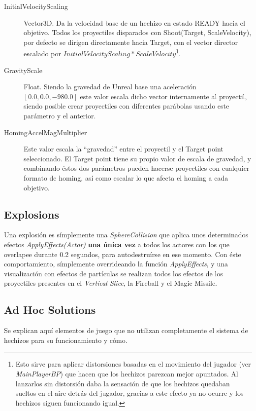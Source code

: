 \documentclass[12pt]{report}
\begin{document}
\begin{description}
	\item[InitialVelocityScaling] Vector3D. Da la velocidad base de un hechizo en estado READY hacia el objetivo. Todos los proyectiles disparados con Shoot(Target, ScaleVelocity), por defecto se dirigen directamente hacia Target, con el vector director escalado por $InitialVelocityScaling * ScaleVelocity$\footnote{Esto sirve para aplicar distorsiones basadas en el movimiento del jugador (ver \textit{MainPlayerBP}) que hacen que los hechizos parezcan mejor apuntados. Al lanzarlos sin distorsión daba la sensación de que los hechizos quedaban sueltos en el aire detrás del jugador, gracias a este efecto ya no ocurre y los hechizos siguen funcionando igual.}.
	\item[GravityScale] Float. Siendo la gravedad de Unreal base una aceleración $[0.0, 0.0, -980.0]$ este valor escala dicho vector internamente al proyectil, siendo posible crear proyectiles con diferentes parábolas usando este parámetro y el anterior.
	\item[HomingAccelMagMultiplier] Este valor escala la ``gravedad'' entre el proyectil y el Target point seleccionado. El Target point tiene su propio valor de escala de gravedad, y combinando éstos dos parámetros pueden hacerse proyectiles con cualquier formato de homing, así como escalar lo que afecta el homing a cada objetivo.
\end{description}

\subsection{Explosions}

Una explosión es símplemente una \textit{SphereCollision} que aplica unos determinados efectos \textit{ApplyEffects(Actor)} \textbf{una única vez} a todos los actores con los que overlapee durante 0.2 segundos, para autodestruírse en ese momento. Con éste comportamiento, símplemente overrideando la función \textit{ApplyEffects}, y una visualización con efectos de partículas se realizan todos los efectos de los proyectiles presentes en el \textit{Vertical Slice}, la Fireball y el Magic Missile.

\subsection{Ad Hoc Solutions}

Se explican aquí elementos de juego que no utilizan completamente el sistema de hechizos para su funcionamiento y cómo.
\end{document}
